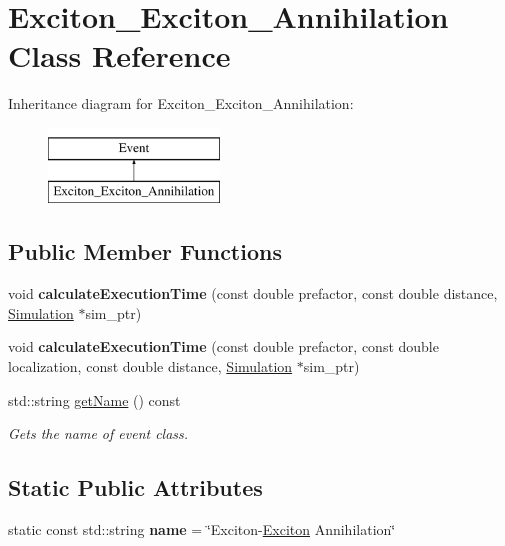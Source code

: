 \hypertarget{class_exciton___exciton___annihilation}{}\section{Exciton\+\_\+\+Exciton\+\_\+\+Annihilation Class Reference}
\label{class_exciton___exciton___annihilation}
Inheritance diagram for Exciton\+\_\+\+Exciton\+\_\+\+Annihilation\+:\begin{figure}[H]
\begin{center}
\leavevmode
\includegraphics[height=2.000000cm]{class_exciton___exciton___annihilation}
\end{center}
\end{figure}
\subsection*{Public Member Functions}
\begin{DoxyCompactItemize}
\item 
\mbox{\label{class_exciton___exciton___annihilation_a46aa32935c16084a6cea854d4350f413}} 
void {\bfseries calculate\+Execution\+Time} (const double prefactor, const double distance, \hyperlink{class_simulation}{Simulation} $\ast$sim\+\_\+ptr)
\item 
\mbox{\label{class_exciton___exciton___annihilation_a7b5546b124fb9dfda409e48b4f6bc885}} 
void {\bfseries calculate\+Execution\+Time} (const double prefactor, const double localization, const double distance, \hyperlink{class_simulation}{Simulation} $\ast$sim\+\_\+ptr)
\item 
std\+::string \hyperlink{class_exciton___exciton___annihilation_a7027d2bee875a346e4c7ec4f07c55816}{get\+Name} () const
\begin{DoxyCompactList}\small\item\em Gets the name of event class. \end{DoxyCompactList}\end{DoxyCompactItemize}
\subsection*{Static Public Attributes}
\begin{DoxyCompactItemize}
\item 
\mbox{\label{class_exciton___exciton___annihilation_a8dee3797f6dc1c50276e06117bee82ac}} 
static const std\+::string {\bfseries name} = \char`\"{}Exciton-\/\hyperlink{class_exciton}{Exciton} Annihilation\char`\"{}
\end{DoxyCompactItemize}


